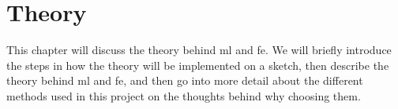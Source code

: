 \chapter{Theory}\label{cha:theory}
This chapter will discuss the theory behind \gls{ml} and \gls{fe}. We will briefly introduce the steps in how the theory will be implemented on a sketch, then describe the theory behind \gls{ml} and \gls{fe}, and then go into more detail about the different methods used in this project on the thoughts behind why choosing them.










